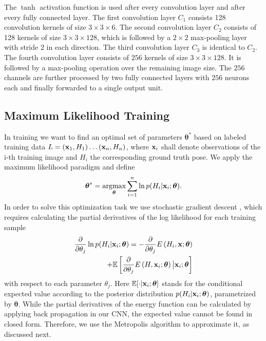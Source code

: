 \documentclass[10pt,letterpaper]{article}
\newcommand{\btheta}{\boldsymbol\theta}
\newcommand{\bx}{{\bf x}}
\newcommand{\argmax}{\operatornamewithlimits{argmax}}
\begin{document}
The $\tanh$ activation function is used after every convolution layer and after every fully connected layer. The first convolution layer $C_1$ consists 128 convolution kernels of size $3 \times 3 \times 6$. The second convolution layer $C_2$ consists of 128 kernels of size $3 \times 3 \times 128$, which is followed by a $2 \times 2$ max-pooling layer with stride 2 in each direction. The third convolution layer $C_3 $ is identical to $C_2$. The fourth convolution layer consists of $256$ kernels of size $3 \times 3 \times 128$. It is followed by a max-pooling operation over the remaining image size. The $256$ channels are further processed by two fully connected layers with $256$ neurons each and finally forwarded to a single output unit.

\subsection{Maximum Likelihood Training}
In training we want to find an optimal set of parameters $\btheta^*$ based on labeled training data $L=(\bx_1, H_1)\dots (\bx_n, H_n)$, where $\bx_i$ shall denote observations of the i-th training image and $H_i$ the corresponding ground truth pose. We apply the maximum likelihood paradigm and define  
\begin{equation} \label{eq:TrainingGoal}
	\btheta^*=\argmax_{\btheta} \sum_{i=1}^n \ln  p(H_i| \bx_i ;\btheta).
\end{equation}
In order to solve this optimization task we use stochastic gradient descent \cite{bottou1991stochastic}, which requires calculating the partial derivatives of the log likelihood for each training sample
\begin{equation} \label{eq:partial}
\begin{split}
	\frac
		{\partial }
		{\partial \theta_j} \ln  p (H_i| \bx_i ;\btheta)
	= 
	-\frac
		{\partial }
		{{\partial \theta_j}} E \left(H_i,\bx;\btheta \right) 
	\\ +\mathbb{E}\left[
	\frac
		{\partial }
		{{\partial \theta_j}} E\left(H,\bx_i;\btheta \right)
	\big| \bx_i ;\btheta \right]
\end{split}
\end{equation}
with respect to each parameter $\theta_j$. Here $\mathbb{E}[\cdot | \bx_i ;\btheta ]$ stands for the conditional expected value according to the posterior distribution $ p(H_i| \bx_i ;\btheta)$, parametrized by $\btheta$. While the partial derivatives of the energy function can be calculated by applying back propagation in our CNN, the expected value cannot be found in closed form. Therefore, we use the Metropolis algorithm \cite{metropolis} to approximate it, as discussed next.
\end{document}
